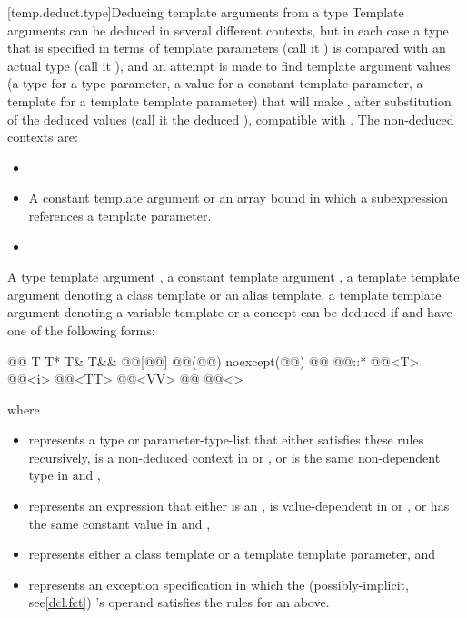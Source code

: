 \documentclass{wg21}
\begin{document}
[temp.deduct.type]{Deducing template arguments from a type}
\pnum
Template arguments can be deduced in several different contexts, but
in each case a type that is specified in terms of template parameters
(call it
)
is compared with an actual type (call it
),
and an attempt is made to find template argument values (a type for a type
parameter, a value for a constant template parameter,  a template for a
template template parameter) that will make
,
after substitution of the deduced values (call it the deduced
),
compatible with
.
\ednote{[...]}
\pnum
The non-deduced contexts are:
\begin{itemize}
    \item
    \ednote{[...]}
    \item
    A constant template argument or an array bound in which a subexpression
    references a template parameter.
    \item
    \ednote{[...]}
\end{itemize}
\ednote{[...]}
\pnum
A type template argument ,
a constant template argument ,
a template template argument 
denoting a class template or an alias template, 
a template template argument 
denoting a variable template or a concept
can be deduced if
and
have one of the following forms:
\begin{codeblock}
    @\opt{\cv{}}@ T
    T*
    T&
    T&&
    @@[@@]
    @@(@@) noexcept(@@)
    @@ @@::*
    @@<T>
    @@<i>
    @@<TT>
    @@<VV>
    @@
    @@<>
\end{codeblock}
where
\begin{itemize}
    \item
     represents a type or parameter-type-list that either
    satisfies these rules recursively,
    is a non-deduced context in  or , or
    is the same non-dependent type in  and ,
    \item
     represents an expression that either
    is an ,
    is value-dependent in  or , or
    has the same constant value in  and ,
    \item
     represents either a class template or
    a template template parameter, and
    \item
     represents an
    exception specification 
    in which the (possibly-implicit, see\ref{dcl.fct})
    's operand
    satisfies the rules for an  above.
\end{itemize}
\end{document}
